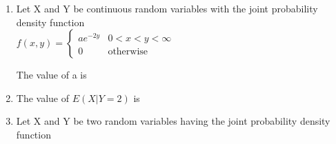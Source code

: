 \begin{enumerate}[label=\thesection.\arabic*.,ref=\thesection.\theenumi]
\begin{enumerate}
    \end{enumerate}
    
        
\item         Let X and Y be continuous random variables with the joint probability density function \\
        
        $
        f(x,y)=
        \begin{cases}
        a{e^{-2y}}
        & 0 <x<y< \infty \\
        0 & \text{otherwise}
        \end{cases}
        $
        
        The value of a is
        
        \begin{enumerate}
        \end{enumerate}
        
        \item The value of $E(X|Y=2)$ is
        
        \begin{enumerate}
        \end{enumerate}
        
        \item Let X and Y be two random variables having the joint probability density function \\


\end{enumerate}
